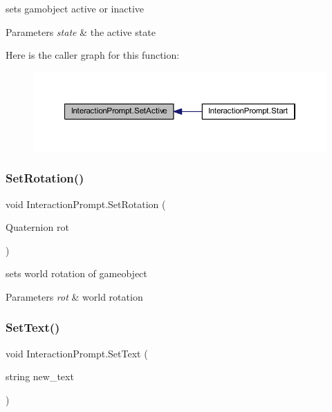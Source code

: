 sets gamobject active or inactive 


\begin{DoxyParams}{Parameters}
{\em state} & the active state\\
\hline
\end{DoxyParams}
Here is the caller graph for this function\+:\nopagebreak
\begin{figure}[H]
\begin{center}
\leavevmode
\includegraphics[width=350pt]{class_interaction_prompt_a409ac8c36942c10be65238a7281932c2_icgraph}
\end{center}
\end{figure}
\mbox{\label{class_interaction_prompt_a88851b5b82c1413a6aad2c02d24708f6}} 
\subsubsection{\texorpdfstring{Set\+Rotation()}{SetRotation()}}
{\footnotesize\ttfamily void Interaction\+Prompt.\+Set\+Rotation (\begin{DoxyParamCaption}\item[{Quaternion}]{rot }\end{DoxyParamCaption})}



sets world rotation of gameobject 


\begin{DoxyParams}{Parameters}
{\em rot} & world rotation\\
\hline
\end{DoxyParams}
\mbox{\label{class_interaction_prompt_ac68329e8bcb18bc4556695f506d5b410}} 
\subsubsection{\texorpdfstring{Set\+Text()}{SetText()}}
{\footnotesize\ttfamily void Interaction\+Prompt.\+Set\+Text (\begin{DoxyParamCaption}\item[{string}]{new\+\_\+text }\end{DoxyParamCaption})}



